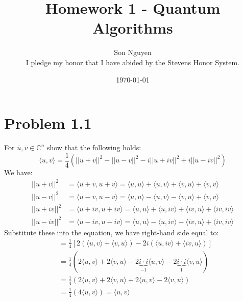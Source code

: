 \documentclass[12pt]{article}
\title{Homework 1 - Quantum Algorithms}
\author{Son Nguyen \\
I pledge my honor that I have abided by the Stevens Honor System.}
\date{\today}
\begin{document}
\maketitle

\section*{Problem 1.1}
For \(\bar{u}, \bar{v} \in \mathbb{C}^n\) show that the following holds:
\[ \langle u, v \rangle = \frac{1}{4}(||u+v||^2 - ||u-v||^2 - i||u+iv||^2 + i||u-iv||^2)\]
We have: 
\begin{align*}
    ||u+v||^2 &= \langle u+v, u+v \rangle = \langle u, u \rangle + \langle u, v \rangle + \langle v, u \rangle + \langle v, v \rangle \\
    ||u-v||^2 &= \langle u-v, u-v \rangle = \langle u, u \rangle - \langle u, v \rangle - \langle v, u \rangle + \langle v, v \rangle \\
    ||u+iv||^2 &= \langle u+iv, u+iv \rangle = \langle u, u \rangle + \langle u, iv \rangle + \langle iv, u \rangle + \langle iv, iv \rangle \\
    ||u-iv||^2 &= \langle u-iv, u-iv \rangle = \langle u, u \rangle - \langle u, iv \rangle - \langle iv, u \rangle + \langle iv, iv \rangle
\end{align*}
Substitute these into the equation, we have right-hand side equal to:
\begin{align*}
    &= \frac{1}{4} \left[2\left(\langle u, v \rangle + \langle v, u\rangle\right) - 2i \left(\langle u, iv\rangle + \langle iv, u\rangle\right)\right] \\
    &= \frac{1}{4} \left(2 \langle u, v \rangle + 2\langle v, u\rangle - 2\underbrace{i \cdot i}_{-1} \langle u, v\rangle - 2 \underbrace{i \cdot \bar{i}}_{1} \langle v, u\rangle\right) \\
    &= \frac{1}{4} \left(2 \langle u, v \rangle + 2\langle v, u\rangle + 2 \langle u, v\rangle - 2 \langle v, u\rangle\right) \\
    &= \frac{1}{4} \left(4 \langle u, v \rangle\right) = \langle u, v \rangle
\end{align*}
\end{document}
